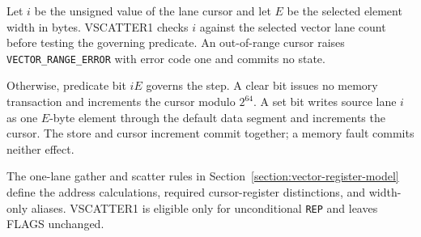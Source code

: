 Let $i$ be the unsigned value of the lane cursor and let $E$ be the selected
element width in bytes.  VSCATTER1 checks $i$ against the selected vector lane
count before testing the governing predicate.  An out-of-range cursor raises
\texttt{VECTOR\_RANGE\_ERROR} with error code one and commits no state.

Otherwise, predicate bit $iE$ governs the step.  A clear bit issues no memory
transaction and increments the cursor modulo $2^{64}$.  A set bit writes source
lane $i$ as one $E$-byte element through the default data segment and increments
the cursor.  The store and cursor increment commit together; a memory fault
commits neither effect.

The one-lane gather and scatter rules in
Section~\ref{section:vector-register-model} define the address calculations,
required cursor-register distinctions, and width-only aliases.  VSCATTER1 is
eligible only for unconditional \texttt{REP} and leaves FLAGS unchanged.
